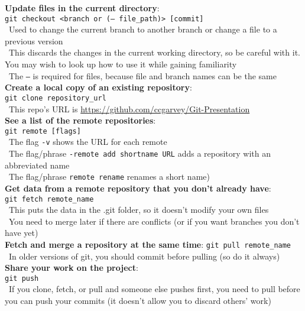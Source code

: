 \documentclass[12pt]{article}
\begin{document}
{{\bf Update files in the current directory}:\\
\texttt{git checkout <branch or (-- file{\_}path)> [commit]}\\
\textbullet\, Used to change the current branch to another branch or change a file to a previous version\\
\textbullet\, This discards the changes in the current working directory, so be careful with it. You may wish to look up how to use it while gaining familiarity\\
\textbullet\, The \texttt{--} is required for files, because file and branch names can be the same\\
    
{\bf Create a local copy of an existing repository}:\\
\texttt{git clone repository{\_}url}\\
\textbullet\, This repo's URL is \url{https://github.com/ccgarvey/Git-Presentation}\\

{\bf See a list of the remote repositories}:\\
\texttt{git remote [flags]}\\
\textbullet\, The flag \texttt{-v} shows the URL for each remote\\
\textbullet\, The flag/phrase \texttt{-remote add shortname URL} adds a repository with an abbreviated name\\
\textbullet\, The flag/phrase \texttt{remote rename} renames a short name)\\

{\bf Get data from a remote repository that you don't already have}:\\
\texttt{git fetch remote{\_}name}\\
\textbullet\, This puts the data in the .git folder, so it doesn't modify your own files\\
\textbullet\, You need to merge later if there are conflicts (or if you want branches you don't have yet)\\
    
{\bf Fetch and merge a repository at the same time}:
\texttt{git pull remote{\_}name}\\
\textbullet\, In older versions of git, you should commit before pulling (so do it always)\\

{\bf Share your work on the project}:\\
\texttt{git push}\\
\textbullet\, If you clone, fetch, or pull and someone else pushes first, you need to pull before you can push your commits (it doesn't allow you to discard others' work)\\

}
\end{document}
